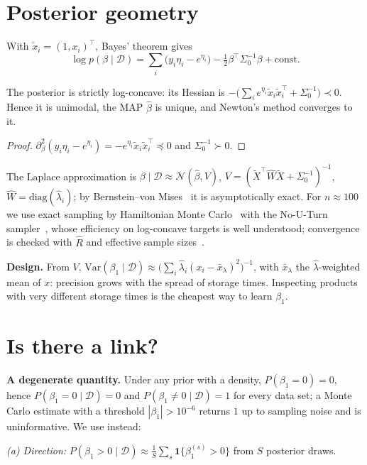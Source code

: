 \documentclass[10pt,twocolumn]{article}
\newcommand{\D}{\mathcal D}
\begin{document}
\section{Posterior geometry}
With $\tilde x_i=(1,x_i)^\top$, Bayes' theorem gives
\begin{equation}
\log p(\beta\mid\D)=\sum_{i}\big(y_i\eta_i-e^{\eta_i}\big)-\tfrac12\beta^\top\Sigma_0^{-1}\beta+\mathrm{const}.
\end{equation}
\begin{proposition}
The posterior is strictly log-concave: its Hessian is $-\big(\sum_ie^{\eta_i}\tilde x_i\tilde x_i^\top+\Sigma_0^{-1}\big)\prec0$. Hence it is unimodal, the MAP $\hat\beta$ is unique, and Newton's method converges to it.
\end{proposition}
\begin{proof}
$\partial^2_\beta(y_i\eta_i-e^{\eta_i})=-e^{\eta_i}\tilde x_i\tilde x_i^\top\preceq0$ and $\Sigma_0^{-1}\succ0$.
\end{proof}
The Laplace approximation is $\beta\mid\D\approx\mathcal N(\hat\beta,V)$, $V=(\tilde X^\top\hat W\tilde X+\Sigma_0^{-1})^{-1}$, $\hat W=\mathrm{diag}(\hat\lambda_i)$; by Bernstein--von Mises~\cite{vandervaart1998} it is asymptotically exact. For $n\approx100$ we use exact sampling by Hamiltonian Monte Carlo~\cite{neal2011} with the No-U-Turn sampler~\cite{hoffman2014}, whose efficiency on log-concave targets is well understood; convergence is checked with $\hat R$ and effective sample sizes~\cite{gelman2013}.

\textbf{Design.} From $V$, $\mathrm{Var}(\beta_1\mid\D)\approx\big(\sum_i\hat\lambda_i(x_i-\bar x_\lambda)^2\big)^{-1}$, with $\bar x_\lambda$ the $\hat\lambda$-weighted mean of $x$: precision grows with the spread of storage times. Inspecting products with very different storage times is the cheapest way to learn $\beta_1$.

\section{Is there a link?}
\textbf{A degenerate quantity.} Under any prior with a density, $P(\beta_1=0)=0$, hence $P(\beta_1=0\mid\D)=0$ and $P(\beta_1\neq0\mid\D)=1$ for every data set; a Monte Carlo estimate with a threshold $|\beta_1|>10^{-6}$ returns $1$ up to sampling noise and is uninformative. We use instead:

\emph{(a) Direction:} $P(\beta_1>0\mid\D)\approx\frac1S\sum_s\mathbf 1\{\beta_1^{(s)}>0\}$ from $S$ posterior draws.
\end{document}
